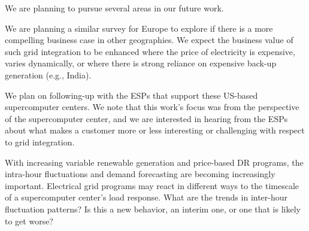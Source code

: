 We are planning to pursue several areas in our future work.

We are planning a similar survey for Europe to explore if there is a more compelling business case 
in other geographies.
We expect the business value of such grid integration to be enhanced where the price of 
electricity is expensive, varies dynamically, or where there is strong reliance on expensive back-up 
generation (e.g., India).   

We plan on following-up with the ESPs that support these US-based supercomputer 
centers. We note that this work's focus was from the perspective of the supercomputer center, and 
we are interested in hearing from the ESPs about what makes a customer more or less interesting or 
challenging with respect to grid integration.

With increasing variable renewable generation and price-based DR programs, the intra-hour fluctuations 
and demand forecasting are becoming increasingly important.
Electrical grid programs may react in different ways to the timescale of a supercomputer center's load response.
What are the trends 
in inter-hour fluctuation patterns?  Is this a new behavior, an interim one, or one that is likely to get worse?

